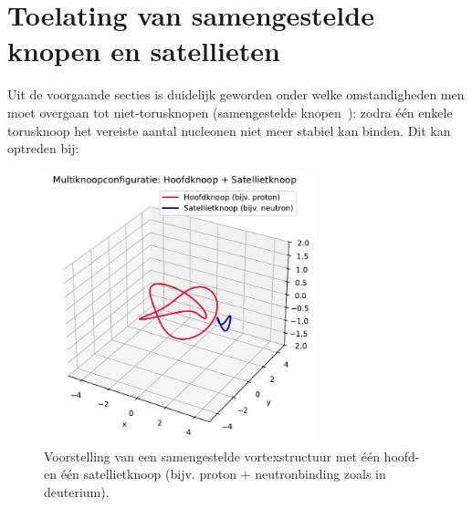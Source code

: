 \section{Toelating van samengestelde knopen en satellieten}

Uit de voorgaande secties is duidelijk geworden onder welke omstandigheden men moet overgaan tot niet-torusknopen (samengestelde knopen~\cite{Faddeev1997KnottedSolitions}): zodra
één enkele torusknoop het vereiste aantal nucleonen niet meer stabiel kan binden. Dit kan optreden bij:

\begin{figure}[H]
    \centering
    \includegraphics[width=0.7\textwidth]{sections/8_multiknoop}
    \caption{Voorstelling van een samengestelde vortexstructuur met één hoofd- en één satellietknoop (bijv. proton + neutronbinding zoals in deuterium).}
    \label{fig:satellietknoop}
\end{figure}

